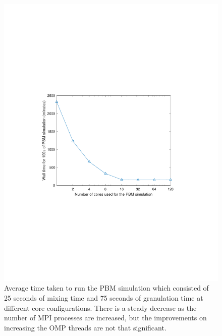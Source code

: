 \documentclass[preprint,11pt,authoryear]{elsarticle}
\begin{document}
\begin{figure}[H]
\centering
\includegraphics[scale=1]{rslsts_PBM_timing.pdf}
\caption{Average time taken to run the PBM simulation which consisted of 25 seconds of mixing time 
and 75 seconds of granulation time at different core configurations. There is a steady decrease as 
the number of MPI processes are increased, but the improvements on increasing the OMP threads are 
not that significant.}
\label{fig:rslts_PBM_timing_studies}
\end{figure}
\end{document}
